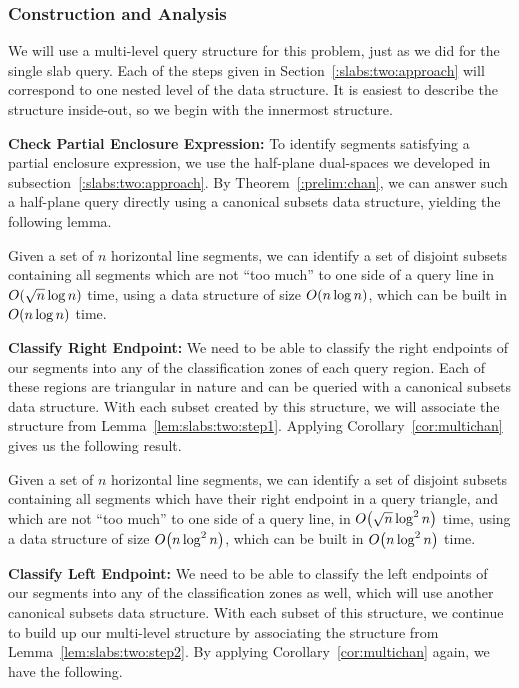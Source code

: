 \subsubsection{Construction and Analysis}
\label{:slabs:two:analysis}

We will use a multi-level query structure for this problem, just as we did for the single slab query.
Each of the steps given in Section~\ref{:slabs:two:approach} will correspond to one nested level of the data structure.
It is easiest to describe the structure inside-out, so we begin with the innermost structure.

{\bf Check Partial Enclosure Expression:}
To identify segments satisfying a partial enclosure expression, we use the half-plane dual-spaces we developed in subsection~\ref{:slabs:two:approach}. 
By Theorem~\ref{:prelim:chan}, we can answer such a half-plane query directly using a canonical subsets data structure, yielding the following lemma.

\begin{lemma}
\label{lem:slabs:two:step1}
Given a set of $n$ horizontal line segments, we can identify a set of disjoint subsets containing all segments which are not ``too much'' to one side of a query line in $O\!\left(\sqrt{n}\log{n}\right)$ time, using a data structure of size $O\!\left(n\log{n}\right)$, which can be built in $O\!\left(n\log{n}\right)$ time.
\end{lemma}

{\bf Classify Right Endpoint:}
We need to be able to classify the right endpoints of our segments into any of the classification zones of each query region.
Each of these regions are triangular in nature and can be queried with a canonical subsets data structure. 
With each subset created by this structure, we will associate the structure from Lemma~\ref{lem:slabs:two:step1}. 
Applying Corollary~\ref{cor:multichan} gives us the following result.

\begin{lemma}
\label{lem:slabs:two:step2}
Given a set of $n$ horizontal line segments, we can identify a set of disjoint subsets containing all segments which have their right endpoint in a query triangle, and which are not ``too much'' to one side of a query line, in $O\!\left(\sqrt{n}\log^2{n}\right)$ time, using a data structure of size $O\!\left(n\log^2{n}\right)$, which can be built in $O\!\left(n\log^2{n}\right)$ time.
\end{lemma}


{\bf Classify Left Endpoint:}
We need to be able to classify the left endpoints of our segments into any of the classification zones as well, which will use another canonical subsets data structure.
With each subset of this structure, we continue to build up our multi-level structure by associating the structure from Lemma~\ref{lem:slabs:two:step2}. 
By applying Corollary~\ref{cor:multichan} again, we have the following.


